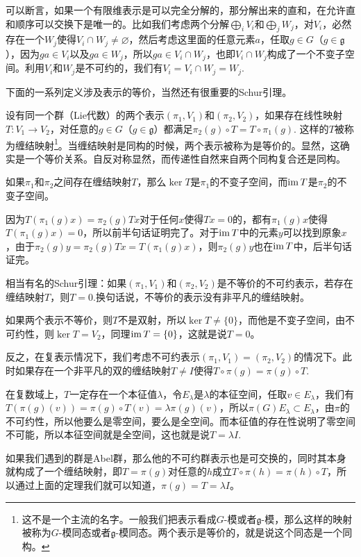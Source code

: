 \documentclass[11pt]{article}
\theoremstyle{definition}
\theoremstyle{plain}
\newcommand{\lag}{{\mathfrak{g}}}
\begin{document}
\para 可以断言，如果一个有限维表示是可以完全分解的，那分解出来的直和，在允许直和顺序可以交换下是唯一的。比如我们考虑两个分解$\bigoplus_i V_i$和$\bigoplus_j W_j$，对$V_i$，必然存在一个$W_j$使得$V_i\cap W_j\neq \varnothing$，然后考虑这里面的任意元素$a$，任取$g\in G$（$g\in\lag$），因为$ga\in V_i$以及$ga\in W_j$，所以$ga\in V_i\cap W_j$，也即$V_i\cap W_j$构成了一个不变子空间。利用$V_i$和$W_j$是不可约的，我们有$V_i=V_i\cap W_j=W_j$.

下面的一系列定义涉及表示的等价，当然还有很重要的Schur引理。

\para 设有同一个群（Lie代数）的两个表示$(\pi_1,V_1)$和$(\pi_2,V_2)$，如果存在线性映射$T:V_1\to V_2$，对任意的$g\in G$（$g\in \lag$）都满足$\pi_2(g)\circ T=T\circ \pi_1(g)$. 这样的$T$被称为缠结映射\footnote{这不是一个主流的名字。一般我们把表示看成$G$-模或者$\lag$-模，那么这样的映射被称为$G$-模同态或者$\lag$-模同态。两个表示是等价的，就是说这个同态是一个同构。}。当缠结映射是同构的时候，两个表示被称为是等价的。显然，这确实是一个等价关系。自反对称显然，而传递性自然来自两个同构复合还是同构。

{\lem 如果$\pi_1$和$\pi_2$之间存在缠结映射$T$，那么$\ker T$是$\pi_1$的不变子空间，而$\operatorname{im} T$是$\pi_2$的不变子空间。\endlem}

\proof 因为$T(\pi_1(g)x)=\pi_2(g)Tx$对于任何$x$使得$Tx=0$的，都有$\pi_1(g)x$使得$T(\pi_1(g)x)=0$，所以前半句话证明完了。对于$\operatorname{im} T$中的元素$y$可以找到原象$x$，由于$\pi_2(g)y=\pi_2(g)Tx=T(\pi_1(g)x)$，则$\pi_2(g)y$也在$\operatorname{im} T$中，后半句话证完。\endproof

{\lem 相当有名的Schur引理：如果$(\pi_1,V_1)$和$(\pi_2,V_2)$是不等价的不可约表示，若存在缠结映射$T$，则$T=0$.换句话说，不等价的表示没有非平凡的缠结映射。\endlem}

\proof 如果两个表示不等价，则$T$不是双射，所以$\ker T\neq \{0\}$，而他是不变子空间，由不可约性，则$\ker T= V_2$，同理$\operatorname{im}  T= \{0\}$，这就是说$T=0$。\endproof

\para 反之，在复表示情况下，我们考虑不可约表示$(\pi_1,V_1)=(\pi_2,V_2)$的情况下。此时如果存在一个非平凡的双的缠结映射$T\neq I$使得$T\circ \pi(g)=\pi(g)\circ T$.

在复数域上，$T$一定存在一个本征值$\lambda$，令$E_\lambda$是$\lambda$的本征空间，任取$v\in E_\lambda$，我们有$T(\pi(g)(v))=\pi(g)\circ T(v)=\lambda\pi(g)(v)$，所以$\pi(G)E_\lambda\subset E_\lambda$，由$\pi$的不可约性，所以他要么是零空间，要么是全空间。而本征值的存在性说明了零空间不可能，所以本征空间就是全空间，这也就是说$T=\lambda I$.

\para 如果我们遇到的群是Abel群，那么他的不可约群表示也是可交换的，同时其本身就构成了一个缠结映射，即$T=\pi(g)$对任意的$h$成立$T\circ \pi(h)=\pi(h)\circ T$，所以通过上面的定理我们就可以知道，$\pi(g)=T=\lambda I$。
\end{document}
